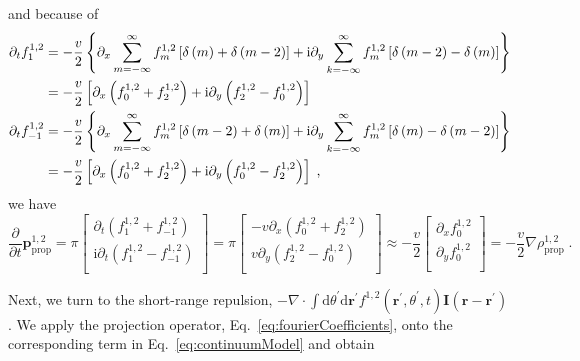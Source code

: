 \documentclass{article}
\begin{document}
and because of 
\begin{subequations}
    \begin{align}
        \partial _tf_{1}^{1,2}&=-\frac{v}{2}\left\{ \partial _x\sum_{m=-\infty}^{\infty}{f_{m}^{1,2}}\left[ \delta \left( m \right) +\delta \left( m-2 \right) \right] +\mathrm{i}\partial _y\sum_{k=-\infty}^{\infty}{f_{m}^{1,2}}\left[ \delta \left( m-2 \right) -\delta \left( m \right) \right] \right\}\notag\\
        &=-\frac{v}{2}\left[ \partial _x\left( f_{0}^{1,2}+f_{2}^{1,2} \right) +\mathrm{i}\partial _y\left( f_{2}^{1,2}-f_{0}^{1,2} \right) \right]\\
        \partial _tf_{-1}^{1,2}&=-\frac{v}{2}\left\{ \partial _x\sum_{m=-\infty}^{\infty}{f_{m}^{1,2}}\left[ \delta \left( m-2 \right) +\delta \left( m \right) \right] +\mathrm{i}\partial _y\sum_{k=-\infty}^{\infty}{f_{m}^{1,2}}\left[ \delta \left( m \right) -\delta \left( m-2 \right) \right] \right\}\notag\\
        &=-\frac{v}{2}\left[ \partial _x\left( f_{0}^{1,2}+f_{2}^{1,2} \right) +\mathrm{i}\partial _y\left( f_{0}^{1,2}-f_{2}^{1,2} \right) \right]\;,
    \end{align}
\end{subequations}
we have
\begin{equation}
    \frac{\partial}{\partial t}\boldsymbol{p}_{\mathrm{prop}}^{1,2}=\pi \left[ \begin{array}{c}
        \partial _t\left( f_{1}^{1,2}+f_{-1}^{1,2} \right)\\
        \mathrm{i}\partial _t\left( f_{1}^{1,2}-f_{-1}^{1,2} \right)\\
    \end{array} \right] =\pi \left[ \begin{array}{c}
        -v\partial _x\left( f_{0}^{1,2}+f_{2}^{1,2} \right)\\
        v\partial _y\left( f_{2}^{1,2}-f_{0}^{1,2} \right)\\
    \end{array} \right] \approx -\frac{v}{2}\left[ \begin{array}{c}
        \partial _xf_{0}^{1,2}\\
        \partial _yf_{0}^{1,2}\\
    \end{array} \right] =-\frac{v}{2}\nabla \rho _{\mathrm{prop}}^{1,2}\;.
\end{equation}

Next, we turn to the short-range repulsion, $-\nabla \cdot \int{\mathrm{d}\theta ^{\prime} \mathrm{d}\mathbf{r}^{\prime} f ^{1,2}\left( \mathbf{r}^{\prime} ,\theta ^{\prime} ,t \right) \mathbf{I}\left( \mathbf{r}-\mathbf{r}^{\prime} \right)}$. We apply the projection operator, Eq.~\eqref{eq:fourierCoefficients}, onto the corresponding term in Eq.~\eqref{eq:continuumModel} and obtain
\end{document}
